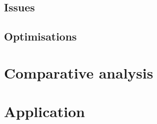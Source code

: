 \documentclass[12pt, a4paper]{article}
\begin{document}
\subsection{Issues}

\subsection{Optimisations}


\section{Comparative analysis}


\section{Application}




\end{document}
